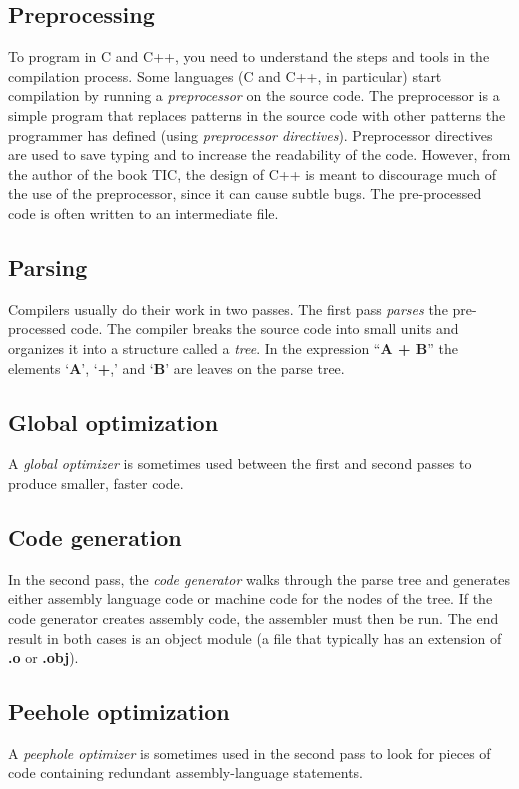 \documentclass[a4paper]{report}
\begin{document}
\subsection{Preprocessing}
To program in C and C++, you need to understand the steps and tools in the compilation process. Some languages (C and C++, in particular) start compilation by running a \emph{preprocessor} on the source code. The preprocessor is a simple program that replaces patterns in the source code with other patterns the programmer has defined (using \emph{preprocessor directives}). Preprocessor directives are used to save typing and to increase the readability of the code. However, from the author of the book TIC, the design of C++ is meant to discourage much of the use of the preprocessor, since it can cause subtle bugs. The pre-processed code is often written to an intermediate file. 
\subsection{Parsing}
Compilers usually do their work in two passes. The first pass \emph{parses} the pre-processed code. The compiler breaks the source code into small units and organizes it into a structure called a \emph{tree}. In the expression “\textbf{A + B}” the elements ‘\textbf{A}’, ‘\textbf{+},’ and ‘\textbf{B}’ are leaves on the parse tree. 
\subsection{Global optimization}
A \emph{global optimizer} is sometimes used between the first and second passes to produce smaller, faster code. 
\subsection{Code generation}
In the second pass, the \emph{code generator} walks through the parse tree and generates either assembly language code or machine code for the nodes of the tree. If the code generator creates assembly code, the assembler must then be run. The end result in both cases is an object module (a file that typically has an extension of \textbf{.o} or \textbf{.obj}).
\subsection{Peehole optimization}
 A \emph{peephole optimizer} is sometimes used in the second pass to look for pieces of code containing redundant assembly-language statements. 
\end{document}
